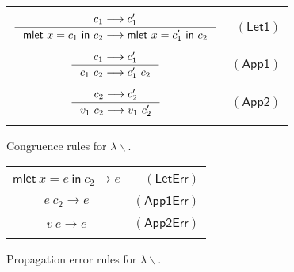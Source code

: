\documentclass[preprint,authoryear,sort&compress,9pt,nocopyrightspace]{article}
\newcommand\rulename[1]{\mathsf{(#1)}}
\newcommand{\tto}{\longrightarrow}
\newcommand{\oletP}[3]{\mathsf{mlet} \ x = #2 \ \mathsf{in}  \ #3}
\newcommand{\semanticA}{$\lambda\backslash$}
\begin{document}
\begin{figure}[h]
\begin{small}
\begin{center}
\begin{tabular}{|c r|}
\hline
&\\
$ \inference {c_1 \tto c_1'}{\oletP{T_1}{c_1}{c_2} \tto \oletP{T_1}{c_1'}{c_2} }$&$\rulename{Let1} $\\
&\\
$\inference {c_1 \tto c_1'}{c_1 \ c_2 \tto c_1' \ c_2} $&$\rulename{App1}  $\\
&\\
$ \inference {c_2 \tto c_2'}{v_1 \ c_2 \tto v_1 \ c_2'}$&$\rulename{App2}  $\\
&\\
\hline
\end{tabular}
\caption{Congruence rules for \semanticA.}
\label{tabla:congruenceRules}
\end{center}
\end{small}
\end{figure}

\begin{figure}[h]
\begin{small}
\begin{center}
\begin{tabular}{|c r|}
\hline
&\\
$ {\oletP{T_1}{e}{c_2} \tto e  }$&$\rulename{LetErr} $\\
&\\
${e \ c_2 \tto e} $&$\rulename{App1Err}  $\\
&\\
$ {v \ e \tto e}$&$\rulename{App2Err}$\\
&\\
\hline
\end{tabular}
\caption{Propagation error rules for \semanticA.}
\label{tabla:errorRules}
\end{center}
\end{small}
\end{figure}
\end{document}
